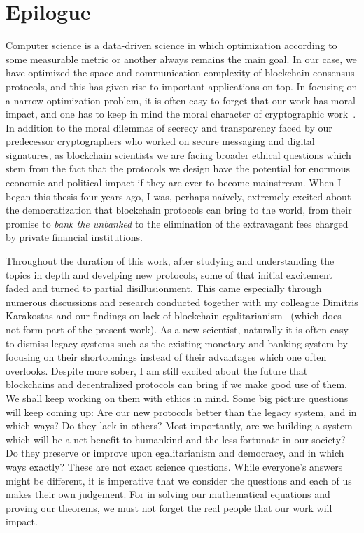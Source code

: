 \section{Epilogue}

Computer science is a data-driven science in which optimization according to
some measurable metric or another always remains the main goal. In our case, we have
optimized the space and communication complexity of blockchain consensus
protocols, and this has given rise to important applications on top. In focusing
on a narrow optimization problem, it is often easy to forget that our work has
moral impact, and one has to keep in mind the moral character of cryptographic
work~\cite{moral}. In addition to the moral dilemmas of secrecy and transparency
faced by our predecessor cryptographers who worked on secure messaging and
digital signatures, as blockchain scientists we are facing broader ethical
questions which stem from the fact that the protocols we design have the
potential for enormous economic and political impact if they are ever to become
mainstream. When I began this thesis four years ago, I was, perhaps na\"ively,
extremely excited about the democratization that blockchain protocols can bring
to the world, from their promise to \emph{bank the unbanked} to the elimination
of the extravagant fees charged by private financial institutions.

Throughout the duration of this work, after studying and understanding the
topics in depth and develping new protocols, some of that initial excitement
faded and turned to partial disillusionment. This came especially through
numerous discussions and research conducted together with my colleague Dimitris
Karakostas and our findings on lack of blockchain
egalitarianism~\cite{egalitarianism} (which does not form part of the present
work). As a new scientist, naturally it is often easy to dismiss legacy systems
such as the existing monetary and banking system by focusing on their
shortcomings instead of their advantages which one often overlooks. Despite more
sober, I am still excited about the future that blockchains and decentralized
protocols can bring if we make good use of them. We shall keep working on them
with ethics in mind. Some big picture questions will keep coming up: Are our new
protocols better than the legacy system, and in which ways? Do they lack in
others? Most importantly, are we building a system which will be a net benefit
to humankind and the less fortunate in our society? Do they preserve or improve
upon egalitarianism and democracy, and in which ways exactly? These are not
exact science questions. While everyone's answers might be different, it is
imperative that we consider the questions and each of us makes their own
judgement. For in solving our mathematical equations and proving our theorems,
we must not forget the real people that our work will impact.

